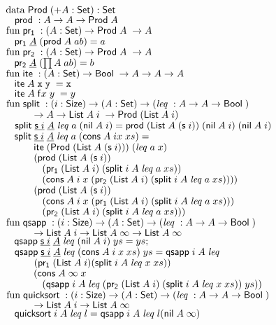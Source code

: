 \begin{bsp}
$\mathrm{data}\; \mathsf{Prod}\; ( + A : \mathsf{Set}) : \mathsf{Set}$\\
$\hspace*{3mm}  \mathsf{prod}\; : A \rightarrow A \rightarrow \mathsf{Prod}\; A$\\
$\mathrm{fun}\; \mathsf{pr_1}\; : ( A : \mathsf{Set} ) \rightarrow \mathsf{Prod}\; A\; \rightarrow A$\\
$\hspace*{3mm} \mathsf{pr_1}\; \underline{A}\; (\mathsf{prod}\; A\; a b) = a$\\
$\mathrm{fun}\; \mathsf{pr_2}\; : ( A : \mathsf{Set} ) \rightarrow \mathsf{Prod}\; A\; \rightarrow A$\\
$\hspace*{3mm} \mathsf{pr_2}\; \underline{A}\; (\prod A\; a b) = b$\\
$\mathrm{fun}\; \mathsf{ite}\; : (A : \mathsf{Set} ) \rightarrow \mathsf{Bool}\; \rightarrow A \rightarrow A \rightarrow A$\\
$\hspace*{3mm} \mathsf{ite}\; A\; \tt x\; y\; = x$\\
$\hspace*{3mm} \mathsf{ite}\; A\; \mathsf{f} x\; y\; = y$\\
$\mathrm{fun}\; \mathsf{split}\; : (i : \mathsf{Size} ) \rightarrow (A : \mathsf{Set} ) \rightarrow ( \mathit{leq}\; : A \rightarrow A \rightarrow \mathsf{Bool}\; )$\\ 
$\spcx	\ra A \ra \List A\; i\; \ra \ProdT (\List A\; i)$\\
$\hspace*{3mm}\mathsf{split}\; \underline{\mathsf{s}\; i}\;     \underline{A}\; \mathit{leq}\; a\; (\mathsf{nil}\; A\; i) = \mathsf{prod}\; (\mathsf{List}\; A\; (\mathsf{s}\; i))\;(\mathsf{nil}\; A\; i)\;(\mathsf{nil}\; A\; i)$\\
$\hspace*{3mm} \mathsf{split}\; \underline{\mathsf{s}\; i}\;    \underline{A}\; \mathit{leq}\; a\; (\mathsf{cons}\; A\; i x\; xs) =$\\ 
$\spcx     \ite (\ProdT (\List A\; (\s i)))\; (\lleq a\; x)$\\ 
$\spcx    (\prd (\List A\; (\s i))$\\
$\spcx \spc       (\pra (\List A\; i)\; (\pivot i\; A\; \lleq a\; xs)) $\\
$\spcx \spc	(\cons A\; i\; x\; (\prb (\List A\; i) \; (\pivot i\; A\; \lleq a\; xs))))$\\ 
$\spcx     (\prd (\List A\; (\s i))$\\
$\spcx	\spc (\cons A\; i\; x\; (\pra (\List A\; i)\; (\pivot i\; A\; \lleq a\; xs)))$\\
$\spcx  \spc (\prb (\List A\; i)\; (\pivot i\; A\; \lleq a\; xs)))$\\
$ \mathrm{fun}\; \mathsf{qsapp}\; : (i : \mathsf{Size} ) \rightarrow ( A : \mathsf{Set} ) \rightarrow ( \mathit{leq}\; : A \rightarrow A \rightarrow \mathsf{Bool}\; )$\\ 
$\spcx	\ra \List A\; i \ra \List A\; \infty \ra \List A\; \infty$\\
$\hspace*{3mm} \mathsf{qsapp}\; \underline{\mathsf{s}\; i}\; \underline{A}\; \mathit{leq}\; (\mathsf{nil}\; A\; i) \;      ys = ys;$\\
$\hspace*{3mm} \mathsf{qsapp}\; \underline{\mathsf{s}\; i}\; \underline{A}\; \mathit{leq}\; (\mathsf{cons}\; A\; i\; x\; xs) \; ys = \mathsf{qsapp}\; i\; A\; \mathit{leq}\;$\\ 
$\spcx	(\pra (\List A\; i) (\pivot i\; A\; \lleq x\; xs))$\\
$\spcx	(\cons A\; \infty \; x\; $\\
$\spcx	\spc   (\qsapp i\; A\; \lleq (\prb (\List A\; i) \; (\pivot i\; A\; \lleq x\; xs))\; ys))$\\
$\mathrm{fun}\; \mathsf{quicksort}\; : (i : \mathsf{Size} ) \rightarrow (A : \mathsf{Set} ) \rightarrow (\mathit{leq}\; : A \rightarrow A \rightarrow \mathsf{Bool}\;)$\\ 
$\spcx	\ra \List A\; i \ra \List A\; \infty$\\
$\hspace*{3mm} \mathsf{quicksort}\; i\; A\; \mathit{leq}\; l = \mathsf{qsapp}\; i\; A\; \mathit{leq}\; l (\mathsf{nil}\; A\; \infty)$ 
\end{bsp}


